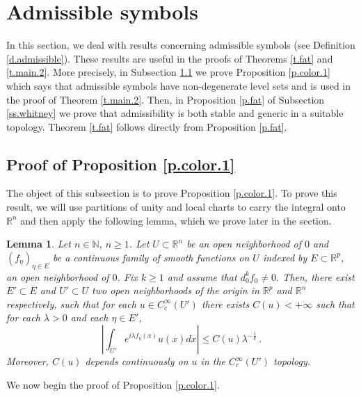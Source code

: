 \documentclass[10pt,twoside]{article}
\newcommand{\R}{\mathbb{R}}
\newcommand{\N}{\mathbb{N}}
\numberwithin{theorem}{section}
\newtheorem{lemma}[theorem]{Lemma}
\begin{document}
\section{Admissible symbols}\label{s.singularities}

In this section, we deal with results concerning admissible symbols (see Definition \ref{d.admissible}). These results are useful in the proofs of Theorems \ref{t.fat} and \ref{t.main.2}. More precisely, in Subsection \ref{ss.color} we prove Proposition \ref{p.color.1} which says that admissible symbols have non-degenerate level sets and is used in the proof of Theorem \ref{t.main.2}. Then, in Proposition \ref{p.fat} of Subsection \ref{ss.whitney} we prove that admissibility is both stable and generic in a suitable topology. Theorem \ref{t.fat} follows directly from Proposition \ref{p.fat}.

\subsection{Proof of Proposition \ref{p.color.1}}\label{ss.color}

The object of this subsection is to prove Proposition \ref{p.color.1}. To prove this result, we will use partitions of unity and local charts to carry the integral onto $\R^n$ and then apply the following lemma, which we prove later in the section.

\begin{lemma}\label{l.color}
Let $n\in\N$, $n\geq 1$. Let $U\subset\R^n$ be an open neighborhood of $0$ and $(f_\eta)_{\eta\in E}$ be a continuous family of smooth functions on $U$ indexed by $E\subset\R^p$, an open neighborhood of $0$. Fix $k\geq 1$ and assume that $d^k_0f_0\neq 0$. Then, there exist $E'\subset E$ and $U'\subset U$ two open neighborhoods of the origin in $\R^p$ and $\R^n$ respectively, such that for each $u\in C^\infty_c(U')$ there exists $C(u)<+\infty$ such that for each $\lambda>0$ and each $\eta\in E'$,
\[
\left|\int_{U'} e^{i\lambda f_\eta(x)}u(x)dx\right|\leq C(u) \lambda^{-\frac{1}{k}}\, .
\]
Moreover, $C(u)$ depends continuously on $u$ in the $C^\infty_c(U')$ topology.
\end{lemma}


We now begin the proof of Proposition \ref{p.color.1}.
\end{document}
